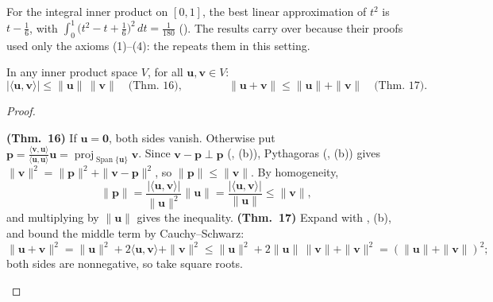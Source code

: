 \documentclass[10pt]{scrartcl}
\newcommand{\vv}[1]{\mathbf{#1}}
\newcommand{\ip}[2]{\langle #1,#2\rangle}
\DeclareMathOperator{\spn}{Span}\DeclareMathOperator{\Nul}{Nul}\DeclareMathOperator{\Col}{Col}\DeclareMathOperator{\Row}{Row}\DeclareMathOperator{\tr}{tr}\DeclareMathOperator{\proj}{proj}\DeclareMathOperator{\dist}{dist}
\begin{document}
\revisit For the integral inner product on $[0,1]$, the best linear approximation of $t^2$ is $t-\frac16$, with $\int_0^1\bigl(t^2-t+\frac16\bigr)^2\,dt=\frac1{180}$ (). The results carry over because their proofs used only the axioms (1)--(4): the  repeats them in this setting.

\begin{theorem*}
  In any inner product space $V$, for all $\vv u,\vv v\in V$:
  \[
    |\ip{\vv u}{\vv v}| \le \|\vv u\|\,\|\vv v\| \quad\text{(Thm.~16)}, \qquad\qquad
    \|\vv u+\vv v\| \le \|\vv u\| + \|\vv v\| \quad\text{(Thm.~17)}.
  \]
\end{theorem*}
\begin{proof}
  \begin{steps}
    \ii \textbf{(Thm.~16)} If $\vv u=\vv 0$, both sides vanish. Otherwise put $\vv p=\frac{\ip{\vv v}{\vv u}}{\ip{\vv u}{\vv u}}\vv u=\proj_{\spn\{\vv u\}}\vv v$. Since $\vv v-\vv p\perp\vv p$ (, (b)), Pythagoras (, (b)) gives $\|\vv v\|^2=\|\vv p\|^2+\|\vv v-\vv p\|^2$, so $\|\vv p\|\le\|\vv v\|$. By homogeneity,
    \[
      \|\vv p\|=\frac{|\ip{\vv u}{\vv v}|}{\|\vv u\|^2}\|\vv u\|=\frac{|\ip{\vv u}{\vv v}|}{\|\vv u\|}\le\|\vv v\|,
    \]
    and multiplying by $\|\vv u\|$ gives the inequality.
    \ii \textbf{(Thm.~17)} Expand with , (b), and bound the middle term by Cauchy--Schwarz:
    \[
      \|\vv u+\vv v\|^2=\|\vv u\|^2+2\ip{\vv u}{\vv v}+\|\vv v\|^2\le \|\vv u\|^2+2\|\vv u\|\,\|\vv v\|+\|\vv v\|^2=(\|\vv u\|+\|\vv v\|)^2;
    \]
    both sides are nonnegative, so take square roots.
  \end{steps}
\end{proof}
\end{document}
